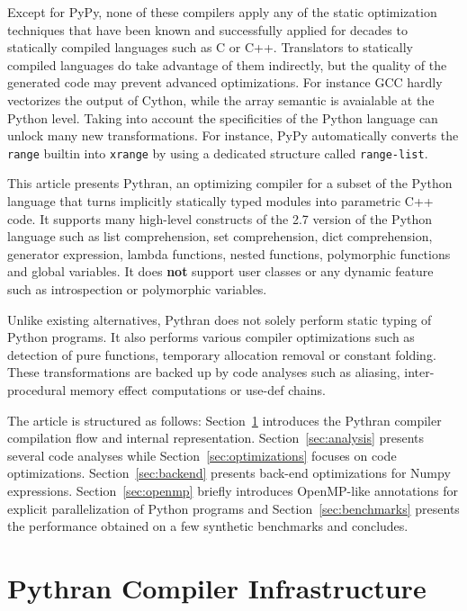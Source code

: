 \documentclass[10pt, onecolumn, preprint]{sigplanconf}
\begin{document}
Except for PyPy, none of these compilers apply any of the static optimization
techniques that have been known and successfully applied 
for decades to statically compiled languages such as C or C++.  Translators to
statically compiled languages do take advantage of them indirectly, but the
quality of the generated code may prevent advanced optimizations. For instance
GCC hardly vectorizes the output of Cython, while the array semantic is
avaialable at the Python level. Taking into account the specificities of the
Python language can unlock many new transformations.  For instance, PyPy
automatically converts the \texttt{range} builtin into \texttt{xrange} by using
a dedicated structure called \texttt{range-list}.

This article presents Pythran, an optimizing compiler for a subset of the
Python language that turns implicitly statically typed modules into parametric
C++ code. It supports many high-level constructs of the 2.7 version of the
Python language such as list comprehension, set comprehension, dict
comprehension, generator expression, lambda functions, nested functions,
polymorphic functions and global variables. It does \textbf{not} support user
classes or any dynamic feature such as introspection or polymorphic variables.

Unlike existing alternatives, Pythran does not solely perform static typing of
Python programs. It also performs various compiler optimizations such as
detection of pure functions, temporary allocation removal or constant folding.
These transformations are backed up by code analyses such as aliasing,
inter-procedural memory effect computations or use-def chains.

The article is structured as follows: Section~\ref{sec:infrastructure}
introduces the Pythran compiler compilation flow and internal representation.
Section~\ref{sec:analysis} presents several code analyses while
Section~\ref{sec:optimizations} focuses on code optimizations.
Section~\ref{sec:backend} presents back-end optimizations for Numpy
expressions. Section~\ref{sec:openmp}  briefly introduces OpenMP-like
annotations for explicit parallelization of Python programs and
Section~\ref{sec:benchmarks} presents the performance obtained on a few
synthetic benchmarks and concludes.


\section{Pythran Compiler Infrastructure}
\label{sec:infrastructure}
\end{document}
